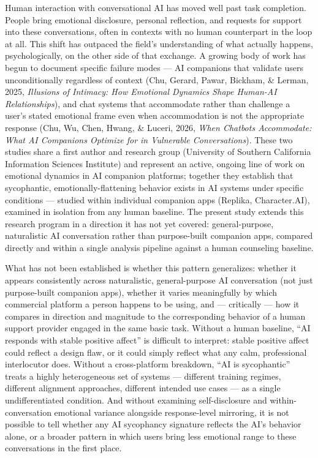 \documentclass[11pt]{article}
\begin{document}
Human interaction with conversational AI has moved well past task completion. People bring emotional disclosure, personal reflection, and requests for support into these conversations, often in contexts with no human counterpart in the loop at all. This shift has outpaced the field's understanding of what actually happens, psychologically, on the other side of that exchange. A growing body of work has begun to document specific failure modes --- AI companions that validate users unconditionally regardless of context (Chu, Gerard, Pawar, Bickham, \& Lerman, 2025, \emph{Illusions of Intimacy: How Emotional Dynamics Shape Human-AI Relationships}), and chat systems that accommodate rather than challenge a user's stated emotional frame even when accommodation is not the appropriate response (Chu, Wu, Chen, Hwang, \& Luceri, 2026, \emph{When Chatbots Accommodate: What AI Companions Optimize for in Vulnerable Conversations}). These two studies share a first author and research group (University of Southern California Information Sciences Institute) and represent an active, ongoing line of work on emotional dynamics in AI companion platforms; together they establish that sycophantic, emotionally-flattening behavior exists in AI systems under specific conditions --- studied within individual companion apps (Replika, Character.AI), examined in isolation from any human baseline. The present study extends this research program in a direction it has not yet covered: general-purpose, naturalistic AI conversation rather than purpose-built companion apps, compared directly and within a single analysis pipeline against a human counseling baseline.

What has not been established is whether this pattern generalizes: whether it appears consistently across naturalistic, general-purpose AI conversation (not just purpose-built companion apps), whether it varies meaningfully by which commercial platform a person happens to be using, and --- critically --- how it compares in direction and magnitude to the corresponding behavior of a human support provider engaged in the same basic task. Without a human baseline, ``AI responds with stable positive affect'' is difficult to interpret: stable positive affect could reflect a design flaw, or it could simply reflect what any calm, professional interlocutor does. Without a cross-platform breakdown, ``AI is sycophantic'' treats a highly heterogeneous set of systems --- different training regimes, different alignment approaches, different intended use cases --- as a single undifferentiated condition. And without examining self-disclosure and within-conversation emotional variance alongside response-level mirroring, it is not possible to tell whether any AI sycophancy signature reflects the AI's behavior alone, or a broader pattern in which users bring less emotional range to these conversations in the first place.
\end{document}
